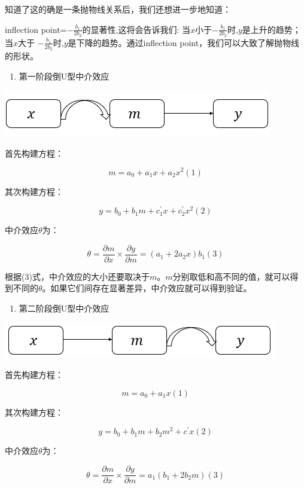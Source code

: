\documentclass[
]{book}
\providecommand{\tightlist}{%
  \setlength{\itemsep}{0pt}\setlength{\parskip}{0pt}}
\begin{document}
知道了这的确是一条抛物线关系后，我们还想进一步地知道：

inflection point=\(-\frac{b_{1}}{2b_{2}}\)的显著性,这将会告诉我们: 当\(x\)小于\(-\frac{b_{1}}{2b_{2}}\)时,\(y\)是上升的趋势；当\(x\)大于 \(-\frac{b_{1}}{2b_{2}}\)时,\(y\)是下降的趋势。通过inflection point，我们可以大致了解抛物线的形状。

\begin{enumerate}
\def\labelenumi{\arabic{enumi}.}
\setcounter{enumi}{1}
\tightlist
\item
  第一阶段倒U型中介效应
\end{enumerate}

\includegraphics{figs/1222.png}

首先构建方程：

\[
m=a_{0}+a_{1}x+a_{2}x^{2}(1)
\]

其次构建方程：

\[
y=b_{0}+b_{1}m+c^{'}_{1}x+c^{'}_{2}x^{2}(2)
\]

中介效应\(\theta\)为：

\[
\theta=\frac{\partial{m}}{\partial{x}}{\times}\frac{\partial{y}}{\partial{m}}=(a_{1}+2a_{2}x)b_{1}(3)
\]

根据(3)式，中介效应的大小还要取决于\(m\)。\(m\)分别取低和高不同的值，就可以得到不同的\(\theta\)。如果它们间存在显著差异，中介效应就可以得到验证。

\begin{enumerate}
\def\labelenumi{\arabic{enumi}.}
\setcounter{enumi}{2}
\tightlist
\item
  第二阶段倒U型中介效应
\end{enumerate}

\includegraphics{figs/1223.png}

首先构建方程：

\[
m=a_{0}+a_{1}x(1)
\]

其次构建方程：

\[
y=b_{0}+b_{1}m+b_{2}m^{2}+c^{'}x(2)
\]

中介效应\(\theta\)为：

\[
\theta=\frac{\partial{m}}{\partial{x}}{\times}\frac{\partial{y}}{\partial{m}}=a_{1}(b_{1}+2b_{2}m)(3)
\]
\end{document}
